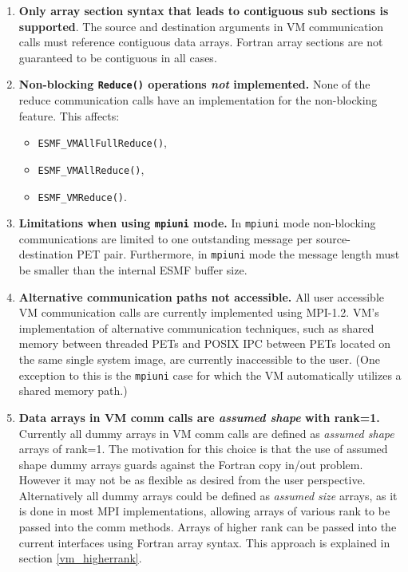

\begin{enumerate}

\item {\bf Only array section syntax that leads to contiguous sub sections is supported}. The source and destination arguments in VM communication calls must reference contiguous data arrays. Fortran array sections are not guaranteed to be contiguous in all cases.

\item {\bf Non-blocking {\tt Reduce()} operations {\em not} implemented.} None of the reduce communication calls have an implementation for the non-blocking feature. This affects:
\begin{itemize}
\item {\tt ESMF\_VMAllFullReduce()},
\item {\tt ESMF\_VMAllReduce()},
\item {\tt ESMF\_VMReduce()}.
\end{itemize}

\item {\bf Limitations when using {\tt mpiuni} mode.} In {\tt mpiuni} mode non-blocking communications are limited to one outstanding message per source-destination PET pair. Furthermore, in {\tt mpiuni} mode the message length must be smaller than the internal ESMF buffer size.

\item {\bf Alternative communication paths not accessible.} All user accessible VM communication calls are currently implemented using MPI-1.2. VM's implementation of alternative communication techniques, such as shared memory between threaded PETs and POSIX IPC between PETs located on the same single system image, are currently inaccessible to the user. (One exception to this is the {\tt mpiuni} case for which the VM automatically utilizes a shared memory path.)

\item {\bf Data arrays in VM comm calls are {\em assumed shape} with rank=1.} Currently all dummy arrays in VM comm calls are defined as {\em assumed shape} arrays of rank=1. The motivation for this choice is that the use of assumed shape dummy arrays guards against the Fortran copy in/out problem. However it may not be as flexible as desired from the user perspective. Alternatively all dummy arrays could be defined as {\em assumed size} arrays, as it is done in most MPI implementations, allowing arrays of various rank to be passed into the comm methods. Arrays of higher rank can be passed into the current interfaces using Fortran array syntax. This approach is explained in section \ref{vm_higherrank}.


\end{enumerate}
